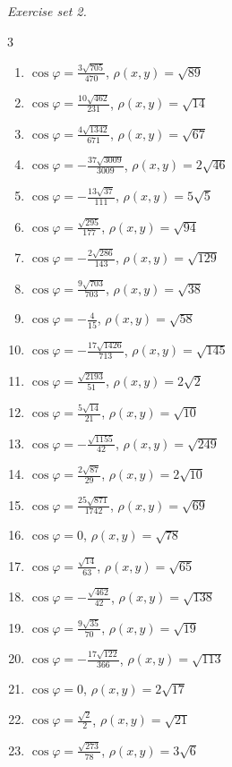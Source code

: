 \par\noindent\emph{Exercise set 2.}\nopagebreak
\begin{multicols}{3}\raggedright
\begin{enumerate}[label=\arabic*., leftmargin=*, itemsep=1pt]
\item $\cos\varphi=\frac{3 \sqrt{705}}{470}$, $\rho(x,y)=\sqrt{89}$
\item $\cos\varphi=\frac{10 \sqrt{462}}{231}$, $\rho(x,y)=\sqrt{14}$
\item $\cos\varphi=\frac{4 \sqrt{1342}}{671}$, $\rho(x,y)=\sqrt{67}$
\item $\cos\varphi=- \frac{37 \sqrt{3009}}{3009}$, $\rho(x,y)=2 \sqrt{46}$
\item $\cos\varphi=- \frac{13 \sqrt{37}}{111}$, $\rho(x,y)=5 \sqrt{5}$
\item $\cos\varphi=\frac{\sqrt{295}}{177}$, $\rho(x,y)=\sqrt{94}$
\item $\cos\varphi=- \frac{2 \sqrt{286}}{143}$, $\rho(x,y)=\sqrt{129}$
\item $\cos\varphi=\frac{9 \sqrt{703}}{703}$, $\rho(x,y)=\sqrt{38}$
\item $\cos\varphi=- \frac{4}{15}$, $\rho(x,y)=\sqrt{58}$
\item $\cos\varphi=- \frac{17 \sqrt{1426}}{713}$, $\rho(x,y)=\sqrt{145}$
\item $\cos\varphi=\frac{\sqrt{2193}}{51}$, $\rho(x,y)=2 \sqrt{2}$
\item $\cos\varphi=\frac{5 \sqrt{14}}{21}$, $\rho(x,y)=\sqrt{10}$
\item $\cos\varphi=- \frac{\sqrt{1155}}{42}$, $\rho(x,y)=\sqrt{249}$
\item $\cos\varphi=\frac{2 \sqrt{87}}{29}$, $\rho(x,y)=2 \sqrt{10}$
\item $\cos\varphi=\frac{25 \sqrt{871}}{1742}$, $\rho(x,y)=\sqrt{69}$
\item $\cos\varphi=0$, $\rho(x,y)=\sqrt{78}$
\item $\cos\varphi=\frac{\sqrt{14}}{63}$, $\rho(x,y)=\sqrt{65}$
\item $\cos\varphi=- \frac{\sqrt{462}}{42}$, $\rho(x,y)=\sqrt{138}$
\item $\cos\varphi=\frac{9 \sqrt{35}}{70}$, $\rho(x,y)=\sqrt{19}$
\item $\cos\varphi=- \frac{17 \sqrt{122}}{366}$, $\rho(x,y)=\sqrt{113}$
\item $\cos\varphi=0$, $\rho(x,y)=2 \sqrt{17}$
\item $\cos\varphi=\frac{\sqrt{2}}{2}$, $\rho(x,y)=\sqrt{21}$
\item $\cos\varphi=\frac{\sqrt{273}}{78}$, $\rho(x,y)=3 \sqrt{6}$

\end{enumerate}
\end{multicols}
